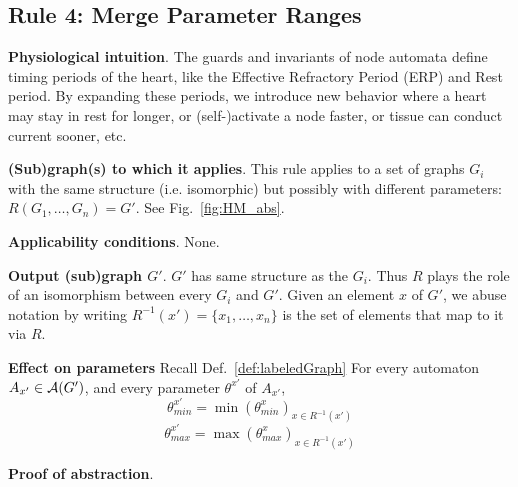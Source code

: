 
%
%

\subsection{Rule 4: Merge Parameter Ranges}
\textbf{Physiological intuition}. 
The guards and invariants of node automata define timing periods of the heart, like the Effective Refractory Period (ERP) and Rest period. 
By expanding these periods, we introduce new behavior where a heart may stay in rest for longer, or (self-)activate a node faster, or tissue can conduct current sooner, etc.

\textbf{(Sub)graph(s) to which it applies}.
This rule applies to a set of graphs $G_i$ with the same structure (i.e. isomorphic) but possibly with different parameters: $R(G_1,\ldots,G_n) = G'$.
See Fig.~\ref{fig:HM_abs}.

\textbf{Applicability conditions}.
None.

\textbf{Output (sub)graph $G'$}.
$G'$ has same structure as the $G_i$.
Thus $R$ plays the role of an isomorphism between every $G_i$ and $G'$.
Given an element $x$ of $G'$, we abuse notation by writing $R^{-1}(x') = \{x_1,\dots,x_n\}$ is the set of elements that map to it via $R$.

\textbf{Effect on parameters}
Recall Def.~\ref{def:labeledGraph}
For every automaton $A_{x'} \in \mathcal{A}(G')$, and every parameter $\theta^{x'}$ of $A_{x'}$, 
\[\theta_{min}^{x'} = \min(\theta^x_{min})_{x \in R^{-1}(x') }\]
\[\theta_{max}^{x'} = \max(\theta^x_{max})_{x \in R^{-1}(x') }\]

\textbf{Proof of abstraction}.
%


